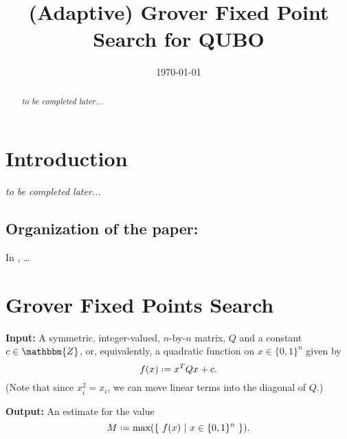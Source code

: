\documentclass[reqno,oneside,12pt]{amsart}  %
\title{(Adaptive) Grover Fixed Point Search for QUBO}
\date{\today}
\numberwithin{equation}{section}                %
\let\originalleft\left
\let\originalright\right
\renewcommand{\left}{\mathopen{}\mathclose\bgroup\originalleft}
\renewcommand{\right}{\aftergroup\egroup\originalright}
\def\({\mathopen{}\left(}
\def\){\right)\mathclose{}}
\newcommand*{\eqdef}{\mathrel{\vcenter{\baselineskip0.5ex \lineskiplimit0pt\hbox{.}\hbox{.}}}=}
\newtheorem*{acknowledgment}{Acknowledgments}
\def\Z{\mathbbm{Z}}
\begin{document}
\begin{abstract}
	\textit{to be completed later...}
\end{abstract}

\maketitle

\section{Introduction}

\textit{to be completed later...}

\smallskip

\subsection*{Organization of the paper:} In , \ldots

\begin{comment}
\smallskip

\begin{acknowledgment}
   
\end{acknowledgment}
\end{comment}

\bigskip

\section{Grover Fixed Points Search}
\label{sec:algo}



\noindent\textbf{Input:} A symmetric, integer-valued, $n$-by-$n$ matrix, $Q$ and a constant $c \in \Z$, or, equivalently, a quadratic function on $x \in \{ 0, 1 \}^n$ given by
\begin{equation}
   f (x) \eqdef x^T Q x + c. \label{eq:QUBO}
\end{equation}
(Note that since $x_i^2 = x_i$, we can move linear terms into the diagonal of $Q$.)

\smallskip

\noindent\textbf{Output:} An estimate for the value
\begin{equation}
   M \eqdef \max \( \left\{ \ f (x) \ \middle| \ x \in \{ 0, 1 \}^n \ \right\} \).
\end{equation}

\medskip
\end{document}
